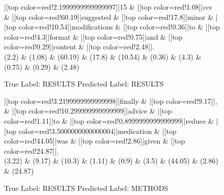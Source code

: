 \documentclass[a4paper, landscape]{article}
\begin{document}
\clearpage
\begin{figure}
\begin{center}
\begin{dependency}
\begin{deptext}
|[top color=red!2.1999999999999997]|15 \& |[top color=red!1.08]|ccs \& |[top color=red!60.19]|suggested \& |[top color=red!17.8]|minor \& |[top color=red!10.54]|modifications \& |[top color=red!0.36]|to \& |[top color=red!4.3]|format \& |[top color=red!0.75]|and \& |[top color=red!0.29]|content \& |[top color=red!2.48]|.\\
(2.2) \& (1.08) \& (60.19) \& (17.8) \& (10.54) \& (0.36) \& (4.3) \& (0.75) \& (0.29) \& (2.48)\\
\end{deptext}
\end{dependency}
\end{center}
\caption{True Label: RESULTS Predicted Label: RESULTS}
\end{figure}
\clearpage
\begin{figure}
\begin{center}
\begin{dependency}
\begin{deptext}
|[top color=red!3.2199999999999998]|finally \& |[top color=red!9.17]|, \& |[top color=red!10.299999999999999]|advice \& |[top color=red!1.11]|to \& |[top color=red!0.8999999999999999]|reduce \& |[top color=red!3.5000000000000004]|medication \& |[top color=red!44.05]|was \& |[top color=red!2.86]|given \& |[top color=red!24.87]|.\\
(3.22) \& (9.17) \& (10.3) \& (1.11) \& (0.9) \& (3.5) \& (44.05) \& (2.86) \& (24.87)\\
\end{deptext}
\end{dependency}
\end{center}
\caption{True Label: RESULTS Predicted Label: METHODS}
\end{figure}
\clearpage
\end{document}
